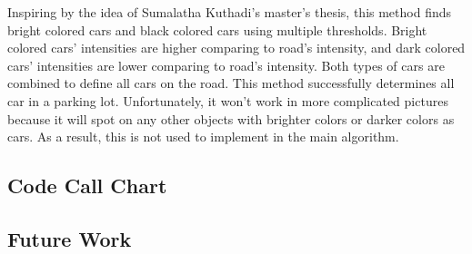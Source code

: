 \documentclass[12pt]{article}
\begin{document}
Inspiring by the idea of Sumalatha Kuthadi's master's thesis, this method finds bright colored cars and black colored cars using multiple thresholds. Bright colored cars' intensities are higher comparing to road's intensity, and dark colored cars' intensities are lower comparing to road's intensity. Both types of cars are combined to define all cars on the road. This method successfully determines all car in a parking lot. Unfortunately, it won't work in more complicated pictures because it will spot on any other objects with brighter colors or darker colors as cars. As a result, this is not used to implement in the main algorithm.

\subsection*{Code Call Chart}

\subsection*{Future Work}
\end{document}
